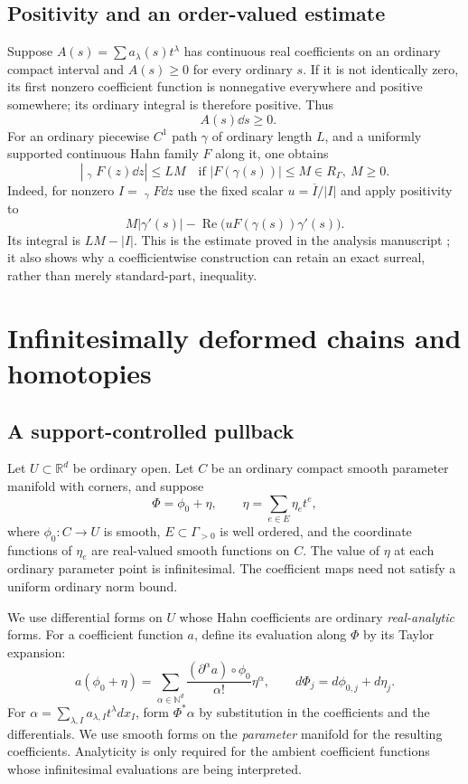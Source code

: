 \documentclass[11pt,letterpaper]{article}
\theoremstyle{definition}
\theoremstyle{remark}
\newcommand{\R}{\mathbb R}\newcommand{\C}{\mathbb C}\newcommand{\Q}{\mathbb Q}
\newcommand{\N}{\mathbb N}\newcommand{\Z}{\mathbb Z}
\newcommand{\HInt}{\mathop{\int^{\!H}}\nolimits}
\numberwithin{equation}{section}
\begin{document}
\subsection{Positivity and an order-valued estimate}
Suppose $A(s)=\sum a_\lambda(s)t^\lambda$ has continuous real coefficients on an ordinary compact interval and $A(s)\ge0$ for every ordinary $s$. If it is not identically zero, its first nonzero coefficient function is nonnegative everywhere and positive somewhere; its ordinary integral is therefore positive. Thus
\[
 \HInt A(s)\dd s\ge0.
\]
For an ordinary piecewise $C^1$ path $\gamma$ of ordinary length $L$, and a uniformly supported continuous Hahn family $F$ along it, one obtains
\begin{equation}\label{eq:ml}
 \left|\HInt_\gamma F(z)\dd z\right|\le LM
 \quad\text{if }|F(\gamma(s))|\le M\in R_\Gamma,\ M\ge0.
\end{equation}
Indeed, for nonzero $I=\HInt_\gamma F\dd z$ use the fixed scalar $u=\overline I/|I|$ and apply positivity to
\[
 M|\gamma'(s)|-\operatorname{Re}\bigl(uF(\gamma(s))\gamma'(s)\bigr).
\]
Its integral is $LM-|I|$. This is the estimate proved in the analysis manuscript \cite{Analysis}; it also shows why a coefficientwise construction can retain an exact surreal, rather than merely standard-part, inequality.

\section{Infinitesimally deformed chains and homotopies}\label{sec:deformed}

\subsection{A support-controlled pullback}
Let $U\subset\R^d$ be ordinary open. Let $C$ be an ordinary compact smooth parameter manifold with corners, and suppose
\begin{equation}\label{eq:deformedmap}
 \Phi=\phi_0+\eta,\qquad
 \eta=\sum_{e\in E}\eta_e t^e,
\end{equation}
where $\phi_0:C\to U$ is smooth, $E\subset\Gamma_{>0}$ is well ordered, and the coordinate functions of $\eta_e$ are real-valued smooth functions on $C$. The value of $\eta$ at each ordinary parameter point is infinitesimal. The coefficient maps need not satisfy a uniform ordinary norm bound.

We use differential forms on $U$ whose Hahn coefficients are ordinary \emph{real-analytic} forms. For a coefficient function $a$, define its evaluation along $\Phi$ by its Taylor expansion:
\begin{equation}\label{eq:formalpullback}
 a(\phi_0+\eta)
 =\sum_{\alpha\in\N^d}\frac{(\partial^\alpha a)\circ\phi_0}{\alpha!}\eta^\alpha,
 \qquad d\Phi_j=d\phi_{0,j}+d\eta_j.
\end{equation}
For $\alpha=\sum_{\lambda,I} a_{\lambda,I}t^\lambda dx_I$, form $\Phi^*\alpha$ by substitution in the coefficients and the differentials. We use smooth forms on the \emph{parameter} manifold for the resulting coefficients. Analyticity is only required for the ambient coefficient functions whose infinitesimal evaluations are being interpreted.
\end{document}
